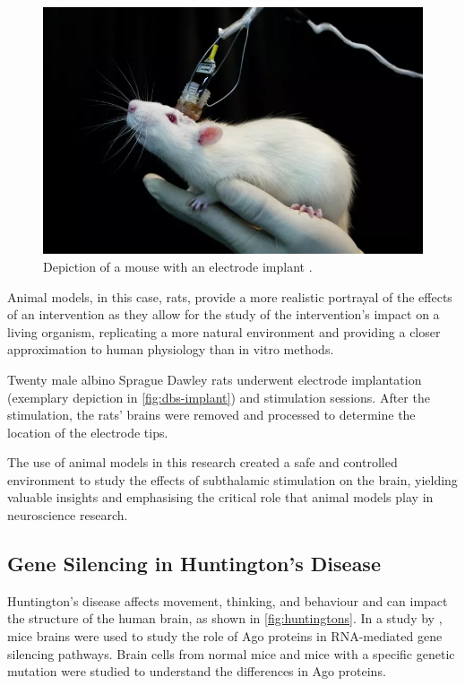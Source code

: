 \documentclass[10pt]{article}
\begin{document}
\begin{sloppypar}
  \begin{figure}[ht]
    \centering
    \includegraphics[width=\textwidth]{figures/scientist-deep-brain-stimulation.png}
    \caption[Depiction of a mouse with an electrode implant]{Depiction of a mouse with an electrode implant \citep{sharma_scientists_2017}.}
    \label{fig:dbs-implant}
  \end{figure}

  Animal models, in this case, rats, provide a more realistic portrayal of the effects of an intervention as they allow for the study of the intervention’s impact on a living organism, replicating a more natural environment and providing a closer approximation to human physiology than in vitro methods.

  Twenty male albino Sprague Dawley rats underwent electrode implantation (exemplary depiction in \autoref{fig:dbs-implant}) and stimulation sessions. After the stimulation, the rats’ brains were removed and processed to determine the location of the electrode tips.

  The use of animal models in this research created a safe and controlled environment to study the effects of subthalamic stimulation on the brain, yielding valuable insights and emphasising the critical role that animal models play in neuroscience research.

  \subsection{Gene Silencing in Huntington’s Disease}
  \label{sec:huntingtons}

  Huntington’s disease affects movement, thinking, and behaviour and can impact the structure of the human brain, as shown in \autoref{fig:huntingtons}. In a study by \cite{savas_huntingtons_2008}, mice brains were used to study the role of Ago proteins in RNA-mediated gene silencing pathways. Brain cells from normal mice and mice with a specific genetic mutation were studied to understand the differences in Ago proteins.


\end{sloppypar}
\end{document}
